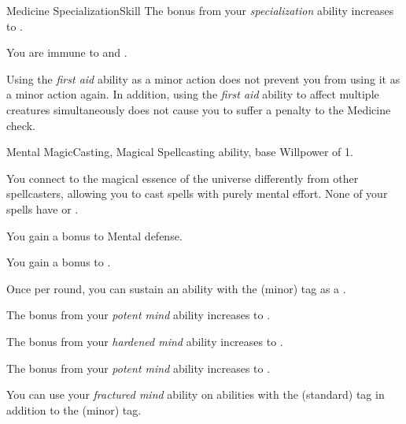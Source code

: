 \begin{feat}{Medicine Specialization}{Skill}
         The bonus from your \textit{specialization} ability increases to .

         You are immune to  and .

         Using the \textit{first aid} ability as a minor action does not prevent you from using it as a minor action again.
        In addition, using the \textit{first aid} ability to affect multiple creatures simultaneously does not cause you to suffer a penalty to the Medicine check.
    \end{feat}

    \begin{feat}{Mental Magic}{Casting, Magical}
        \featpre Spellcasting ability, base Willpower of 1.

         You connect to the magical essence of the universe differently from other spellcasters, allowing you to cast spells with purely mental effort.
        None of your spells have  or .

         You gain a  bonus to Mental defense.

         You gain a  bonus to  .

         Once per round, you can sustain an ability with the  (minor) tag as a .

         The bonus from your \textit{potent mind} ability increases to .

         The bonus from your \textit{hardened mind} ability increases to .

         The bonus from your \textit{potent mind} ability increases to .

         You can use your \textit{fractured mind} ability on abilities with the  (standard) tag in addition to the  (minor) tag.
    \end{feat}

